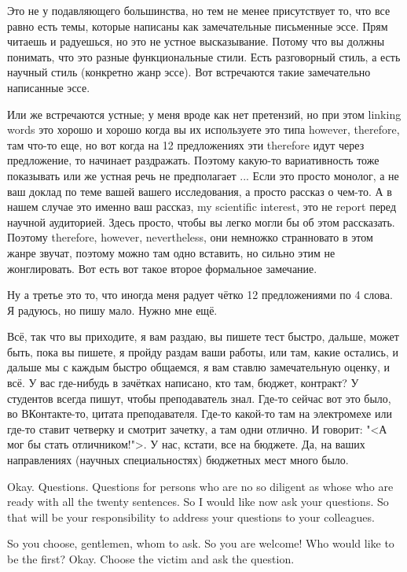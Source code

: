 \documentclass[main.tex]{subfiles}
\begin{document}
Это не у подавляющего большинства, но тем не менее присутствует то, что все равно есть темы, которые написаны как замечательные письменные эссе.
Прям читаешь и радуешься, но это не устное высказывание.
Потому что вы должны понимать, что это разные функциональные стили.
Есть разговорный стиль, а есть научный стиль (конкретно жанр эссе).
Вот встречаются такие замечательно написанные эссе.

Или же встречаются устные; у меня вроде как нет претензий, но при этом linking words это хорошо и хорошо когда вы их используете это типа however, therefore, там что-то еще, но вот когда на 12 предложениях эти therefore идут через предложение, то начинает раздражать.
Поэтому какую-то вариативность тоже показывать или же устная речь не предполагает ...
Если это просто монолог, а не ваш доклад по теме вашей вашего исследования, а просто рассказ о чем-то.
А в нашем случае это именно ваш рассказ, my scientific interest, это не report перед научной аудиторией.
Здесь просто, чтобы вы легко могли бы об этом рассказать.
Поэтому therefore, however, nevertheless, они немножко странновато в этом жанре звучат, поэтому можно там одно вставить, но сильно этим не жонглировать.
Вот есть вот такое второе формальное замечание.

Ну а третье это то, что иногда меня радует чётко 12 предложениями по 4 слова.
Я радуюсь, но пишу мало.
Нужно мне ещё.

Всё, так что вы приходите, я вам раздаю, вы пишете тест быстро, дальше, может быть, пока вы пишете, я пройду раздам ваши работы, или там, какие остались, и дальше мы с каждым быстро общаемся, я вам ставлю замечательную оценку, и всё.
У вас где-нибудь в зачётках написано, кто там, бюджет, контракт?
У студентов всегда пишут, чтобы преподаватель знал.
Где-то сейчас вот это было, во ВКонтакте-то, цитата преподавателя.
Где-то какой-то там на электромехе или где-то ставит четверку и смотрит зачетку, а там одни отлично.
И говорит: "<А мог бы стать отличником!">.
У нас, кстати, все на бюджете.
Да, на ваших направлениях (научных специальностях) бюджетных мест много было.

\newpage
{}

Okay.
Questions.
Questions for persons who are no so diligent as whose who are ready with all the twenty sentences.
So I would like now ask your questions.
So that will be your responsibility to address your questions to your colleagues.

So you choose, gentlemen, whom to ask.
So you are welcome!
Who would like to be the first?
Okay.
Choose the victim and ask the question.
\end{document}
